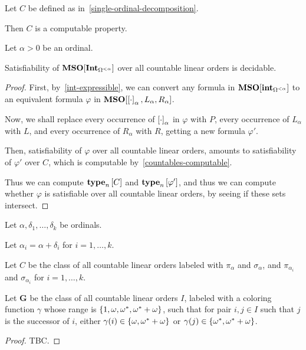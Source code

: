 \begin{corollary}\label{countables-computable}
  Let $C$ be defined as in~\cref{single-ordinal-decomposition}.

  Then $C$ is a computable property.
\end{corollary}

\begin{theorem}\label{single-ordinal-satisfiability}
  Let $\alpha > 0$ be an ordinal.

  Satisfiability of $\mathbf{MSO}[\mathbf{Int}_{\Omega^{< \alpha}}]$ 
  over all countable linear orders is decidable.
\end{theorem}

\begin{proof}
  First, by~\cref{int-expressible}, we can convert
  any formula in $\mathbf{MSO}[\mathbf{int}_{\Omega^{< \alpha}}]$
  to an equivalent formula $\varphi$ in $\mathbf{MSO}[\left[ {\cdot} \right]_{\alpha}, L_{\alpha}, R_{\alpha}]$.

  Now, we shall replace every occurrence of $\left[ {\cdot} \right]_{\alpha}$ in $\varphi$ with $P$,
  every occurrence of $L_{\alpha}$ with $L$,
  and every occurrence of $R_{\alpha}$ with $R$,
  getting a new formula $\varphi'$.

  Then, satisfiability of $\varphi$ over all countable linear orders,
  amounts to satisfiability of $\varphi'$ over $C$,
  which is computable by~\cref{countables-computable}.

  Thus we can compute $\mathbf{type}_{n} \left[ {C} \right]$ and $\mathbf{type}_{n} \left[ {\varphi'} \right]$,
  and thus we can compute whether $\varphi$ is satisfiable over all countable linear orders,
  by seeing if these sets intersect.
\end{proof}

\begin{theorem}
  Let $\alpha, \delta_1, \ldots, \delta_k$ be ordinals.

  Let $\alpha_i = \alpha + \delta_i$ for $i = 1, \ldots, k$.

  Let $C$ be the class of all countable linear orders
  labeled with $\pi_{\alpha}$ and $\sigma_{\alpha}$,
  and $\pi_{\alpha_i}$ and $\sigma_{\alpha_i}$ for $i = 1, \ldots, k$.

  Let $\mathbf{G}$ be the class of all countable linear orders $I$,
  labeled with a coloring function $\gamma$
  whose range is $\left\{ {1, \omega, \omega^\ast, \omega^\ast + \omega} \right\}$,
  such that for pair $i, j \in I$ such that $j$ is the successor of $i$,
  either $\gamma(i) \in \left\{ {\omega, \omega^\ast + \omega} \right\}$
  or $\gamma(j) \in \left\{ {\omega^\ast, \omega^\ast + \omega} \right\}$.
\end{theorem}

\begin{proof}
  TBC.
\end{proof}